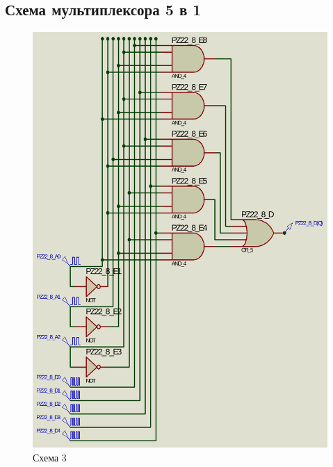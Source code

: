 \documentclass{article}
\begin{document}
\begin{normalsize}
	\section*{Схема мультиплексора 5 в 1}
	\begin{figure}[H]
		\centering
		\includegraphics[scale=0.34]{s3}	
		\caption{Схема 3}
	\end{figure}


\end{normalsize}
\end{document}
